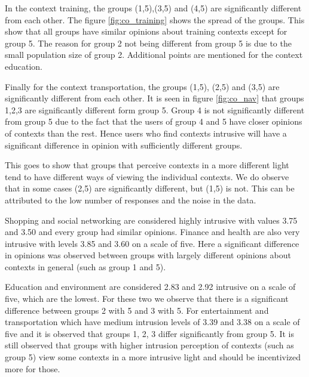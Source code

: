 In the context training, the groups (1,5),(3,5) and (4,5) are significantly different from each other. The figure \ref{fig:co_training} shows the spread of the groups. This show that all groups have similar opinions about training contexts except for group 5. The reason for group 2 not being different from group 5 is due to the small population size of group 2. Additional points are mentioned for the context education.

Finally for the context transportation, the groups (1,5), (2,5) and (3,5) are significantly different from each other. It is seen in figure \ref{fig:co_nav} that groups 1,2,3 are significantly different form group 5. Group 4 is not significantly different from group 5 due to the fact that the users of group 4 and 5 have closer opinions of contexts than the rest. Hence users who find contexts intrusive will have a significant difference in opinion with sufficiently different groups.

This goes to show that groups that perceive contexts in a more different light tend to have different ways of viewing the individual contexts. We do observe that in some cases (2,5) are significantly different, but (1,5) is not. This can be attributed to the low number of responses
and the noise in the data. 

Shopping and social networking are considered highly intrusive with values 3.75 and 3.50 and every group had similar opinions. Finance and health are also very intrusive with levels 3.85 and 3.60 on a scale of five. Here a significant difference in opinions was observed between groups with largely different opinions about contexts in general (such as group 1 and 5).

Education and environment are considered 2.83 and 2.92 intrusive on a scale of five, which are the lowest. For these two we observe that there is a significant difference between groups 2 with 5 and 3 with 5. For entertainment and transportation which have medium intrusion levels of 3.39 and 3.38 on a scale of five and it is observed that groups 1, 2, 3 differ significantly from group 5. It is still observed that groups with higher intrusion perception of contexts (such as group 5) view some contexts in a more intrusive light and should be incentivized more for those.

